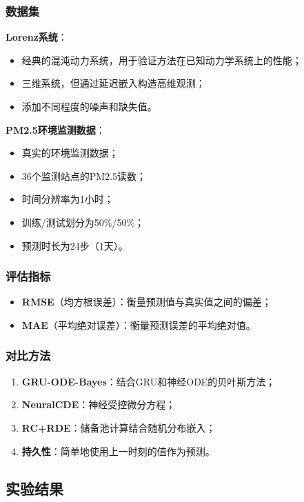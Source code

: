 \documentclass[12pt,a4paper]{article}
\begin{document}
\subsubsection{数据集}

\textbf{Lorenz系统}：
\begin{itemize}
    \item 经典的混沌动力系统，用于验证方法在已知动力学系统上的性能；
    \item 三维系统，但通过延迟嵌入构造高维观测；
    \item 添加不同程度的噪声和缺失值。
\end{itemize}

\textbf{PM2.5环境监测数据}：
\begin{itemize}
    \item 真实的环境监测数据；
    \item 36个监测站点的PM2.5读数；
    \item 时间分辨率为1小时；
    \item 训练/测试划分为50\%/50\%；
    \item 预测时长为24步（1天）。
\end{itemize}

\subsubsection{评估指标}
\begin{itemize}
    \item \textbf{RMSE}（均方根误差）：衡量预测值与真实值之间的偏差；
    \item \textbf{MAE}（平均绝对误差）：衡量预测误差的平均绝对值。
\end{itemize}

\subsubsection{对比方法}
\begin{enumerate}
    \item \textbf{GRU-ODE-Bayes}：结合GRU和神经ODE的贝叶斯方法；
    \item \textbf{NeuralCDE}：神经受控微分方程；
    \item \textbf{RC+RDE}：储备池计算结合随机分布嵌入；
    \item \textbf{持久性}：简单地使用上一时刻的值作为预测。
\end{enumerate}

\subsection{实验结果}
\end{document}
